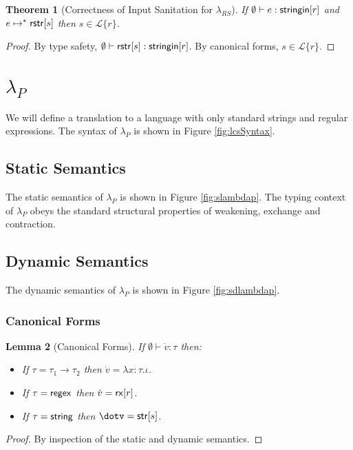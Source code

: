\documentclass[11pt,leqno]{article}
\newtheorem{thm}{Theorem}
\newtheorem{lem}[thm]{Lemma}
\theoremstyle{definition}
\newcommand{\Lagr}{\mathcal{L}}
\newcommand{\lang}[1]{\Lagr\{#1\}}
\newcommand{\lambdas}{\lambda_{RS}}
\newcommand{\lambdap}{\lambda_P}
\newcommand{\stringin}[1]{{\sf stringin}[#1]}
\renewcommand{\tstr}[1]{{{\sf str}[#1]}}
\newcommand{\rx}[1]{ {\sf rx}[#1] }
\newcommand{\str}{{\sf string}}
\newcommand{\regex}{{\sf regex}}
\begin{document}
\begin{thm}[Correctness of Input Sanitation for $\lambdas$]\label{thm:scorrect}
  If  $\emptyset \vdash e : \stringin{r}$ and $e \mapsto^* {\sf rstr}[s]$ then $s \in \lang{r}$.
\end{thm}
\begin{proof}
By type safety, $\emptyset \vdash \rstr{s} : \stringin{r}$. By canonical forms, $s \in \lang{r}$.
\end{proof}


\section{$\lambdap$}
We will define a translation to a language with only standard strings and regular expressions. The syntax of $\lambdap$ is shown in Figure \ref{fig:lcsSyntax}.


\subsection{Static Semantics}
The static semantics of $\lambdap$ is shown in Figure \ref{fig:slambdap}. The typing context of $\lambdap$ obeys the standard structural properties of weakening, exchange and contraction.

\subsection{Dynamic Semantics}
The dynamic semantics of $\lambdap$ is shown in Figure \ref{fig:sdlambdap}.

\subsubsection{Canonical Forms}
\begin{lem}[Canonical Forms]
If $\emptyset \vdash \dot{v} : \tau$ then:
\begin{itemize}
\item If $\tau=\tau_1 \rightarrow \tau_2$ then $\dot{v}=\lambda x : \tau.\iota$.
\item 
If $\tau = \regex$ then $\dot{v}=\rx{r}$.
\item If $\tau = \str$ then $\dotv=\tstr{s}$.
\end{itemize}
\end{lem}
\begin{proof} By inspection of the static and dynamic semantics. \end{proof}
\end{document}
